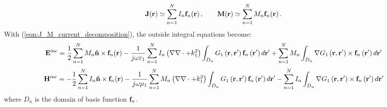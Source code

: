 \begin{equation}\label{eqn:J_M_current_decomposition}
\mathbf{J}\!\left(\mathbf{r}\right) \simeq \sum_{n = 1}^{N} I_n \mathbf{f}_n \!\left(\mathbf{r}\right), \qquad \mathbf{M}\!\left(\mathbf{r}\right) \simeq \sum_{n = 1}^{N} M_n \mathbf{f}_n \!\left(\mathbf{r}\right).
\end{equation}
With (\ref{eqn:J_M_current_decomposition}), the outside integral equations become:
\begin{equation}
\mathbf{E}^\text{inc} =  \frac{1}{2} \sum_{n=1}^N M_n \mathbf{\hat{n}} \times \mathbf{f}_n\!\left(\mathbf{r}\right) - \frac{1}{j \omega \varepsilon_1} \sum_{n=1}^{N} I_n \left(\nabla \nabla \cdot + k_1^2\right) \int_{D_n} G_1\left(\mathbf{r}, \mathbf{r}'\right) \mathbf{f}_n\left(\mathbf{r}'\right) d\mathbf{r}' +  \sum_{n=1}^{N} M_n \int_{D_n} \nabla G_1\left(\mathbf{r}, \mathbf{r}'\right) \times \mathbf{f}_n\left(\mathbf{r}'\right) d\mathbf{r}'
\end{equation}
\begin{equation}
\mathbf{H}^\text{inc} =  -\frac{1}{2} \sum_{n=1}^N I_n \mathbf{\hat{n}} \times \mathbf{f}_n\!\left(\mathbf{r}\right) - \frac{1}{j \omega \mu_1} \sum_{n=1}^{N} M_n \left(\nabla \nabla \cdot + k_1^2\right) \int_{D_n} G_1\left(\mathbf{r}, \mathbf{r}'\right) \mathbf{f}_n\left(\mathbf{r}'\right) d\mathbf{r}' -  \sum_{n=1}^{N} I_n \int_{D_n} \nabla G_1\left(\mathbf{r}, \mathbf{r}'\right) \times \mathbf{f}_n\left(\mathbf{r}'\right) d\mathbf{r}'
\end{equation}
where $D_n$ is the domain of basis function $\mathbf{f}_n$.

